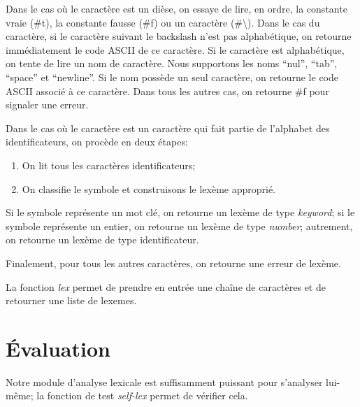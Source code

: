 \documentclass[11pt]{report}
\begin{document}
Dans le cas où le caractère est un dièse, on essaye de lire, en ordre,
la constante vraie (\#t), la constante fausse (\#f) ou un caractère
(\#\textbackslash).  Dans le cas du caractère, si le caractère suivant
le backslash n'est pas alphabétique, on retourne immédiatement le code
ASCII de ce caractère.  Si le caractère est alphabétique, on tente de
lire un nom de caractère.  Nous supportons les noms ``nul'', ``tab'',
``space'' et ``newline''.  Si le nom possède un seul caractère, on
retourne le code ASCII associé à ce caractère.  Dans tous les autres
cas, on retourne \#f pour signaler une erreur.

Dans le cas où le caractère est un caractère qui fait partie de
l'alphabet des identificateurs, on procède en deux étapes:

\begin{enumerate}
\item On lit tous les caractères identificateurs;
\item On classifie le symbole et construisons le lexème approprié.
\end{enumerate}

Si le symbole représente un mot clé, on retourne un lexème de type
\emph{keyword}; si le symbole représente un entier, on retourne un
lexème de type \emph{number}; autrement, on retourne un lexème de type
identificateur.

Finalement, pour tous les autres caractères, on retourne une erreur de
lexème.

La fonction \emph{lex} permet de prendre en entrée une chaîne de
caractères et de retourner une liste de lexemes.

\section{Évaluation}

Notre module d'analyse lexicale est suffisamment puissant pour
s'analyser lui-même; la fonction de test \emph{self-lex} permet de
vérifier cela.
\end{document}
